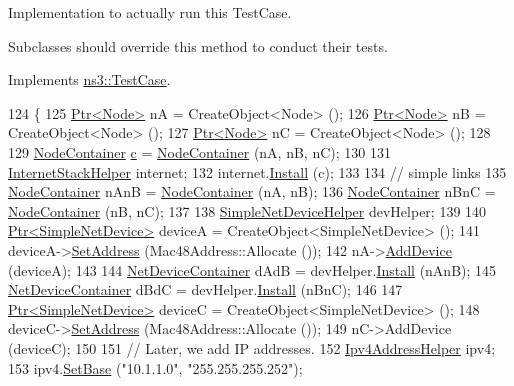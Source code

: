 Implementation to actually run this Test\+Case. 

Subclasses should override this method to conduct their tests. 

Implements \hyperlink{classns3_1_1TestCase_a8ff74680cf017ed42011e4be51917a24}{ns3\+::\+Test\+Case}.


\begin{DoxyCode}
124 \{
125   \hyperlink{classns3_1_1Ptr}{Ptr<Node>} nA = CreateObject<Node> ();
126   \hyperlink{classns3_1_1Ptr}{Ptr<Node>} nB = CreateObject<Node> ();
127   \hyperlink{classns3_1_1Ptr}{Ptr<Node>} nC = CreateObject<Node> ();
128 
129   \hyperlink{classns3_1_1NodeContainer}{NodeContainer} \hyperlink{lte_2model_2fading-traces_2fading__trace__generator_8m_ae0323a9039add2978bf5b49550572c7c}{c} = \hyperlink{classns3_1_1NodeContainer}{NodeContainer} (nA, nB, nC);
130 
131   \hyperlink{classns3_1_1InternetStackHelper}{InternetStackHelper} internet;
132   internet.\hyperlink{classns3_1_1InternetStackHelper_a6645b412f31283d2d9bc3d8a95cebbc0}{Install} (c);
133 
134   \textcolor{comment}{// simple links}
135   \hyperlink{classns3_1_1NodeContainer}{NodeContainer} nAnB = \hyperlink{classns3_1_1NodeContainer}{NodeContainer} (nA, nB);
136   \hyperlink{classns3_1_1NodeContainer}{NodeContainer} nBnC = \hyperlink{classns3_1_1NodeContainer}{NodeContainer} (nB, nC);
137 
138   \hyperlink{classns3_1_1SimpleNetDeviceHelper}{SimpleNetDeviceHelper} devHelper;
139 
140   \hyperlink{classns3_1_1Ptr}{Ptr<SimpleNetDevice>} deviceA = CreateObject<SimpleNetDevice> ();
141   deviceA->\hyperlink{classns3_1_1SimpleNetDevice_a968ef3e7318bac29d5f1d7d977029af4}{SetAddress} (Mac48Address::Allocate ());
142   nA->\hyperlink{classns3_1_1Node_a42ff83ee1d5d1649c770d3f5b62375de}{AddDevice} (deviceA);
143 
144   \hyperlink{classns3_1_1NetDeviceContainer}{NetDeviceContainer} dAdB = devHelper.\hyperlink{classns3_1_1SimpleNetDeviceHelper_a35bed9cee32d306362d3e24dfeef4513}{Install} (nAnB);
145   \hyperlink{classns3_1_1NetDeviceContainer}{NetDeviceContainer} dBdC = devHelper.\hyperlink{classns3_1_1SimpleNetDeviceHelper_a35bed9cee32d306362d3e24dfeef4513}{Install} (nBnC);
146 
147   \hyperlink{classns3_1_1Ptr}{Ptr<SimpleNetDevice>} deviceC = CreateObject<SimpleNetDevice> ();
148   deviceC->\hyperlink{classns3_1_1SimpleNetDevice_a968ef3e7318bac29d5f1d7d977029af4}{SetAddress} (Mac48Address::Allocate ());
149   nC->AddDevice (deviceC);
150 
151   \textcolor{comment}{// Later, we add IP addresses.}
152   \hyperlink{classns3_1_1Ipv4AddressHelper}{Ipv4AddressHelper} ipv4;
153   ipv4.\hyperlink{classns3_1_1Ipv4AddressHelper_acf7b16dd25bac67e00f5e25f90a9a035}{SetBase} (\textcolor{stringliteral}{"10.1.1.0"}, \textcolor{stringliteral}{"255.255.255.252"});

\end{DoxyCode}
